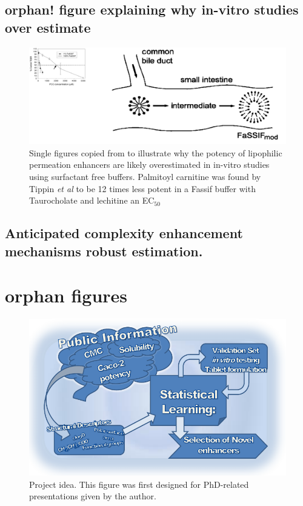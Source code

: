 \subsection{orphan! figure explaining why in-vitro studies over estimate}
\begin{figure}[!htpb]
\includegraphics[width=\textwidth,height=\textheight,keepaspectratio]{graphics/devel_Fasssif_PCC2.png}
\caption{Single figures copied from \cite{tippin2008biorelevant,nawroth2011liposome} to illustrate why the potency of lipophilic permeation enhancers are likely overestimated in in-vitro studies using surfactant free buffers. Palmitoyl carnitine was found by Tippin \textit{et al} to be 12 times less potent in a Fassif buffer with Taurocholate and lechitine an EC$_{50}$}
\label{devel_fassif}
\end{figure}


\subsection{Anticipated complexity enhancement mechanisms robust estimation.}
\label{modelComplexity}

\section{orphan figures}




\begin{figure}[!htbp]
\includegraphics{graphics/workSummary_130mm.pdf}
\caption{Project idea. This figure was first designed for PhD-related presentations given by the author.}
\label{workSummary}
\end{figure}

